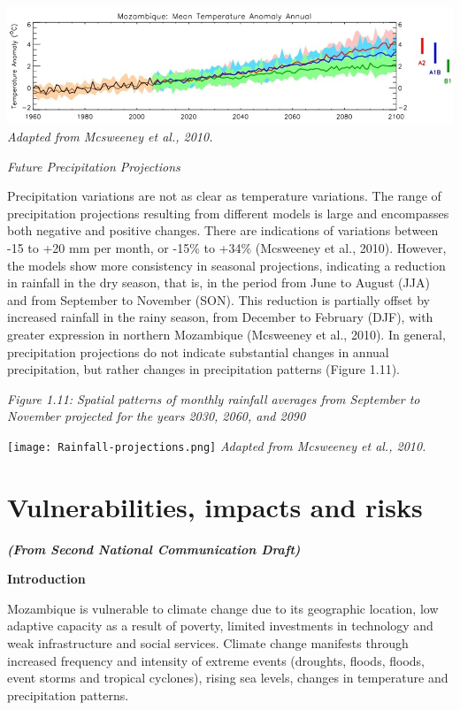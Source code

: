 \documentclass[
]{book}
\begin{document}
\includegraphics{Temperature-mean.png}
\emph{Adapted from Mcsweeney et al., 2010.}

\emph{Future Precipitation Projections}

Precipitation variations are not as clear as temperature variations. The range of precipitation projections resulting from different models is large and encompasses both negative and positive changes. There are indications of variations between -15 to +20 mm per month, or -15\% to +34\% (Mcsweeney et al., 2010). However, the models show more consistency in seasonal projections, indicating a reduction in rainfall in the dry season, that is, in the period from June to August (JJA) and from September to November (SON). This reduction is partially offset by increased rainfall in the rainy season, from December to February (DJF), with greater expression in northern Mozambique (Mcsweeney et al., 2010). In general, precipitation projections do not indicate substantial changes in annual precipitation, but rather changes in precipitation patterns (Figure 1.11).

\emph{Figure 1.11: Spatial patterns of monthly rainfall averages from September to November projected for the years 2030, 2060, and 2090}

\texttt{[image: Rainfall-projections.png]}
\emph{Adapted from Mcsweeney et al., 2010.}

\hypertarget{vulnerabilities-impacts-and-risks}{%
\section{Vulnerabilities, impacts and risks}\label{vulnerabilities-impacts-and-risks}}

\textbf{\emph{(From Second National Communication Draft)}}

\textbf{Introduction}

Mozambique is vulnerable to climate change due to its geographic location, low adaptive capacity as a result of poverty, limited investments in technology and weak infrastructure and social services. Climate change manifests through increased frequency and intensity of extreme events (droughts, floods, floods, event storms and tropical cyclones), rising sea levels, changes in temperature and precipitation patterns.
\end{document}
